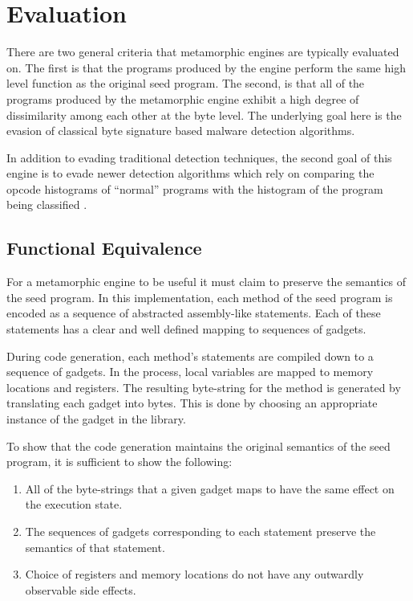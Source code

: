 \chapter{Evaluation}

    There are two general criteria that metamorphic engines are typically
    evaluated on. The first is that the programs produced by the engine perform
    the same high level function as the original seed program. The second, is
    that all of the programs produced by the metamorphic engine exhibit a high
    degree of dissimilarity among each other at the byte level. The underlying
    goal here is the evasion of classical byte signature based malware detection
    algorithms.

    In addition to evading traditional detection techniques, the second goal
    of this engine is to evade newer detection algorithms which rely on
    comparing the opcode histograms of ``normal'' programs with the
    histogram of the program being classified \cite{histogram}.

\section{Functional Equivalence}

    For a metamorphic engine to be useful it must claim to preserve the
    semantics of the seed program. In this implementation, each method of
    the seed program is encoded as a sequence of abstracted assembly-like
    statements. Each of these statements has a clear and well defined
    mapping to sequences of gadgets.
    
    During code generation, each method's statements are compiled down to a
    sequence of gadgets. In the process, local variables are mapped to memory
    locations and registers. The resulting byte-string for the method is
    generated by translating each gadget into bytes. This is done by choosing an
    appropriate instance of the gadget in the library.

    To show that the code generation maintains the original semantics of the
    seed program, it is sufficient to show the following:

    \begin{enumerate}

        \item All of the byte-strings that a given gadget maps to have the
            same effect on the execution state.

        \item The sequences of gadgets corresponding to each statement
            preserve the semantics of that statement.

        \item Choice of registers and memory locations do not have any
            outwardly observable side effects.

    \end{enumerate}

